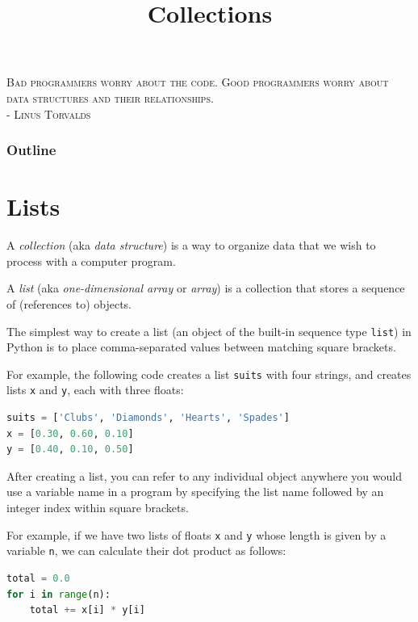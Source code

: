 \documentclass[8pt,a4paper,compress,handout]{beamer}
\title{Collections}
\date{}
\begin{document}
\begin{frame}
\begin{flushright}
\tiny \textsc{Bad programmers worry about the code. Good programmers worry about data structures and their relationships. \\ - Linus Torvalds}
\end{flushright}
\titlepage
\end{frame}

\begin{frame}
\frametitle{Outline}
\tableofcontents
\end{frame}

\section{Lists}
\begin{frame}[fragile]
A \emph{collection} (aka \emph{data structure}) is a way to organize data that we wish to process with a computer program.

\bigskip

A \emph{list} (aka \emph{one-dimensional array} or \emph{array}) is a collection that stores a sequence of (references to) objects.

\bigskip

The simplest way to create a list (an object of the built-in sequence type \lstinline{list}) in Python is to place comma-separated values between matching square brackets. 

\bigskip

For example, the following code creates a list \lstinline{suits} with four strings, and creates lists \lstinline{x} and \lstinline{y}, each with three floats:

\begin{lstlisting}[language=Python]
suits = ['Clubs', 'Diamonds', 'Hearts', 'Spades']
x = [0.30, 0.60, 0.10]
y = [0.40, 0.10, 0.50]
\end{lstlisting}

\bigskip

After creating a list, you can refer to any individual object anywhere you would use a variable name in a program by specifying the list name followed by an integer index within square brackets.

\bigskip

For example, if we have two lists of floats \lstinline{x} and \lstinline{y} whose length is given by a variable \lstinline{n}, we can calculate their dot product as follows:

\begin{lstlisting}[language=Python]
total = 0.0
for i in range(n):
    total += x[i] * y[i]
\end{lstlisting} 
\end{frame}
\end{document}
